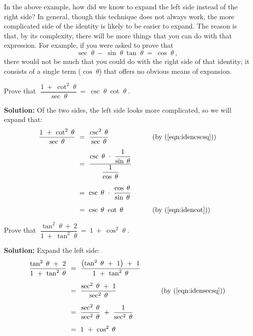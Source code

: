 In the above example, how did we know to expand the left side instead of the right side? In general,
though this technique does not always work, the more complicated side of the identity is likely to
be easier to expand. The reason is that, by its complexity, there will be more things that you can
do with that expression. For example, if you were asked to prove that
\begin{displaymath}
 \sec\;\theta ~-~ \sin\;\theta ~ \tan\;\theta ~=~ \cos\;\theta ~,
\end{displaymath}
there would not be much that you could do with the right side of that identity; it consists of a
single term ($\cos\;\theta$) that offers no obvious means of expansion.

\begin{exmp}
 Prove that $\;\dfrac{1 ~+~ \cot^2 \;\theta}{\sec\;\theta} ~=~ \csc\;\theta ~
 \cot\;\theta\;$.\vspace{2mm}
 \par\noindent\textbf{Solution:} Of the two sides, the left side looks more complicated, so we will
 expand that:
 \begin{alignat*}{3}
  \frac{1 ~+~ \cot^2 \;\theta}{\sec\;\theta} ~ &= ~ \frac{\csc^2 \;\theta}{\sec\;\theta}
   &{} \qquad &\text{(by (\ref{eqn:idencscsq}))}\\[1.5mm]
  &= ~ \dfrac{\csc\;\theta ~\cdot~ \dfrac{1}{\sin\;\theta}}{\dfrac{1}{\cos\;\theta}} &{}
   &{}\\[2mm]
  &= ~ \csc\;\theta ~\cdot~ \frac{\cos\;\theta}{\sin\;\theta} &{} &{}\\[2mm]
  &= ~ \csc \;\theta ~ \cot \;\theta &{} \qquad &\text{(by (\ref{eqn:idencot}))}
 \end{alignat*}
\end{exmp}\vspace{-2mm}
\divider
\newpage
\begin{exmp}
 Prove that $\;\dfrac{\tan^2 \;\theta ~+~ 2}{1 ~+~ \tan^2 \;\theta} ~=~ 1 ~+~
 \cos^2 \;\theta\;$.\vspace{2mm}
 \par\noindent\textbf{Solution:} Expand the left side:
 \begin{alignat*}{3}
  \frac{\tan^2 \;\theta ~+~ 2}{1 ~+~ \tan^2 \;\theta} ~ &= ~
   \frac{\left( \tan^2 \;\theta ~+~ 1 \right) ~+~ 1}{1 ~+~ \tan^2 \;\theta} &{} \qquad &{}\\[2mm]
  &= ~ \frac{\sec^2 \;\theta ~+~ 1}{\sec^2 \;\theta} &{} \qquad
   &\text{(by (\ref{eqn:idensecsq}))}\\[2mm]
  &= ~ \frac{\sec^2 \;\theta}{\sec^2 \;\theta} ~+~ \frac{1}{\sec^2 \;\theta} &{} &{}\\[2mm]
  &= ~ 1 ~+~ \cos^2 \;\theta\
 \end{alignat*}
\end{exmp}\vspace{-2mm}
\divider
\vspace{1mm}

